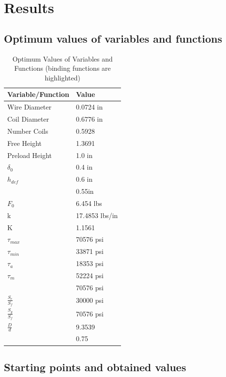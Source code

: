 \documentclass{article}
\begin{document}
\section{Results}
\subsection{Optimum values of variables and functions}
\begin{table}[H]
    \centering
    \caption{Optimum Values of Variables and Functions (binding functions are highlighted)}
    \label{tab:optimums}
    \begin{tabular}{ll}
    \hline
        \textbf{Variable/Function} & \textbf{Value}\\
    \hline
        Wire Diameter & 0.0724 in \\
        Coil Diameter & 0.6776 in \\
        Number Coils  & 0.5928    \\
        Free Height   & 1.3691   \\
        Preload Height & 1.0 in\\
        $\delta_{0}$ & 0.4 in\\
        $h_{def}$ & 0.6 in\\
        \cellcolor[HTML]{FFFE65}{\color[HTML]{333333}$h_{s}$} & 0.55in\\
        $F_{0}$ & 6.454 lbs\\
        k & 17.4853 lbs/in\\
        K & 1.1561\\
        $\tau_{max}$ & 70576 psi\\
        $\tau_{min}$ & 33871 psi\\
        $\tau_{a}$ & 18353 psi\\
        $\tau_{m}$ & 52224 psi\\
        \cellcolor[HTML]{FFFE65}{\color[HTML]{333333}$\tau_{a} + \tau_{m}$} & 70576 psi\\
        $\frac{S_{e}}{S_{f}}$ & 30000 psi\\
        $\frac{S_{y}}{S_{f}}$ & 70576 psi\\
        $\frac{D}{d}$ & 9.3539\\
        \cellcolor[HTML]{FFFE65}{\color[HTML]{333333}$D + d$} & 0.75\\
    \hline
    \end{tabular}
\end{table}


\subsection{Starting points and obtained values}
\end{document}
